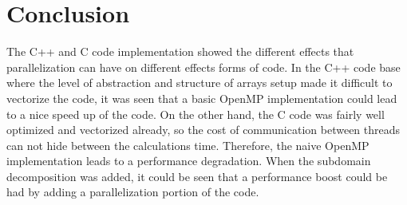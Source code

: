 \documentclass[12pt]{article}
\begin{document}
\section{Conclusion}

The C++ and C code implementation showed the different effects that parallelization can have on different effects forms of code. In the C++ code base where the level of abstraction and structure of arrays setup made it difficult to vectorize the code, it was seen that a basic OpenMP implementation could lead to a nice speed up of the code. On the other hand, the C code was fairly well optimized and vectorized already, so the cost of communication between threads can not hide between the calculations time. Therefore, the naive OpenMP implementation leads to a performance degradation.  When the subdomain decomposition was added, it could be seen that a performance boost could be had by adding a parallelization portion of the code.

%	 
%	
	
\end{document}
